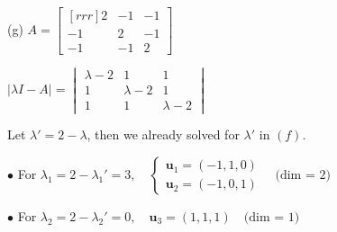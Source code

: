 \documentclass{article}
\begin{document}
    \begin{minipage}[t]{0.48\linewidth}
        (g) $A = \begin{bmatrix}[rrr]
            2 & -1 & -1 \\
            -1 & 2 &  -1\\
            -1 & -1 & 2
        \end{bmatrix} $
        
        $| \lambda I - A| = \begin{vmatrix}
            \lambda  - 2 & 1 & 1 \\
            1 & \lambda  - 2 & 1 \\
            1 & 1 & \lambda  - 2 
        \end{vmatrix} $

        Let $\lambda' = 2 - \lambda$, then we already solved for $\lambda'$ in $(f)$.

        $\bullet$ For $ \lambda _1 = 2 - \lambda_1' = 3, \quad 
         \begin{cases}{}
            \textbf{u}_1  = (-1, 1, 0) \\
            \textbf{u} _2 = (-1, 0, 1)
        \end{cases} \quad \text{(dim = 2)} $

        $\bullet$ For $ \lambda _2 = 2 - \lambda_2' = 0, \quad \textbf{u} _3 = (1,1,1) \quad \text{(dim = 1)}$



    \end{minipage} \hfill
\end{document}
